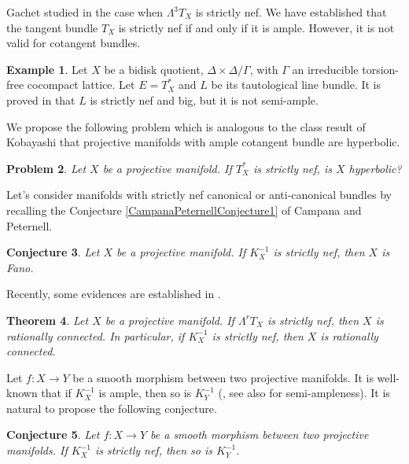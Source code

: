 \documentclass[english,reqno]{amsart}
\theoremstyle{plain}
\newtheorem{thm}{Theorem}[section]
\newtheorem{conj}[thm]{Conjecture}
\newtheorem{problem}[thm]{Problem}
\theoremstyle{definition}
\newtheorem{example}[thm]{Example}
\numberwithin{equation}{section} %
\begin{document}
\noindent Gachet studied in \cite{Gachet2019}  the case when $\Lambda^3 T_X$ is strictly nef.  We have established that the tangent bundle    $T_X$ is
strictly nef if and only if  it is ample.  However, it is not valid for cotangent bundles.
\begin{example}\label{cotangentbundle} Let $X$ be a bidisk quotient, $\Delta\times\Delta/\Gamma$, with $\Gamma$ an irreducible torsion-free cocompact lattice. Let $E=T_X^*$ and $L$ be its tautological line bundle.   It is proved in \cite{ShepherdBarron1995} that $L$ is strictly nef and big, but it is not semi-ample.
\end{example}


\noindent  We propose the following problem which is analogous to the class result of Kobayashi that projective manifolds with ample cotangent bundle are hyperbolic.

\begin{problem} Let $X$ be a projective manifold. If $T_X^*$ is strictly nef,  is $X$ hyperbolic?
\end{problem}


  Let's consider manifolds with strictly nef canonical or anti-canonical bundles by recalling the Conjecture \ref{CampanaPeternellConjecture1} of Campana and Peternell.

\begin{conj} \label{CampanaPeternellConjecture} Let $X$ be a    projective
    manifold. If $K_X^{-1}$ is strictly nef, then $X$
    is  Fano.
\end{conj}


\noindent  Recently,  some evidences  are  established in \cite[Theorem~1.2]{LiOuYang2019}.

\begin{thm}\label{LOYrationallyconnected} Let $X$ be a projective manifold.  If $\Lambda^rT_X$ is strictly nef, then $X$ is rationally connected. In particular, if $K^{-1}_X$ is strictly nef, then $X$ is rationally connected.
    \end{thm}





\noindent Let $f:X\rightarrow Y$ be a smooth morphism between two projective manifolds. It is well-known that if $K^{-1}_X$ is ample, then so is $K^{-1}_Y$ (\cite{KollarMiyaokaMori1992}, see also \cite{BirkarChen2016} for semi-ampleness).  It is natural to propose the following conjecture.
\begin{conj}\label{directimage} Let $f:X\rightarrow Y$ be a smooth morphism between two projective manifolds. If $K^{-1}_X$ is strictly nef, then so is $K^{-1}_Y$.
\end{conj}
\end{document}
